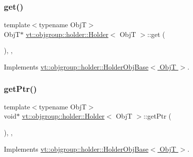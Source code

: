 \subsubsection{\texorpdfstring{get()}{get()}}
{\footnotesize\ttfamily template$<$typename ObjT$>$ \\
ObjT$\ast$ \hyperlink{structvt_1_1objgroup_1_1holder_1_1_holder}{vt\+::objgroup\+::holder\+::\+Holder}$<$ ObjT $>$\+::get (\begin{DoxyParamCaption}{ }\end{DoxyParamCaption})\hspace{0.3cm}{\ttfamily [inline]}, {\ttfamily [override]}, {\ttfamily [virtual]}}



Implements \hyperlink{structvt_1_1objgroup_1_1holder_1_1_holder_obj_base_a4b350b0126259d31a62fd426a08f6698}{vt\+::objgroup\+::holder\+::\+Holder\+Obj\+Base$<$ Obj\+T $>$}.

\mbox{\label{structvt_1_1objgroup_1_1holder_1_1_holder_a856859dca0c0ee3fb6ebace444a36200}} 
\subsubsection{\texorpdfstring{get\+Ptr()}{getPtr()}}
{\footnotesize\ttfamily template$<$typename ObjT$>$ \\
void$\ast$ \hyperlink{structvt_1_1objgroup_1_1holder_1_1_holder}{vt\+::objgroup\+::holder\+::\+Holder}$<$ ObjT $>$\+::get\+Ptr (\begin{DoxyParamCaption}{ }\end{DoxyParamCaption})\hspace{0.3cm}{\ttfamily [inline]}, {\ttfamily [override]}, {\ttfamily [virtual]}}



Implements \hyperlink{structvt_1_1objgroup_1_1holder_1_1_holder_obj_base_aa08fdb3d076043c004e3674a136f84c3}{vt\+::objgroup\+::holder\+::\+Holder\+Obj\+Base$<$ Obj\+T $>$}.

\mbox{\label{structvt_1_1objgroup_1_1holder_1_1_holder_a4ce99c48b611a65189a6891c780b6500}} 
